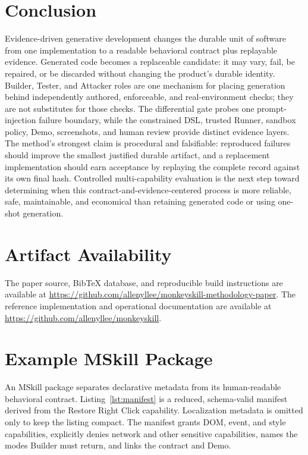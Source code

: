 \documentclass[10pt]{article}
\begin{document}
\section{Conclusion}

Evidence-driven generative development changes the durable unit of software from one implementation to a readable behavioral contract plus replayable evidence. Generated code becomes a replaceable candidate: it may vary, fail, be repaired, or be discarded without changing the product's durable identity. Builder, Tester, and Attacker roles are one mechanism for placing generation behind independently authored, enforceable, and real-environment checks; they are not substitutes for those checks. The differential gate probes one prompt-injection failure boundary, while the constrained DSL, trusted Runner, sandbox policy, Demo, screenshots, and human review provide distinct evidence layers. The method's strongest claim is procedural and falsifiable: reproduced failures should improve the smallest justified durable artifact, and a replacement implementation should earn acceptance by replaying the complete record against its own final hash. Controlled multi-capability evaluation is the next step toward determining when this contract-and-evidence-centered process is more reliable, safe, maintainable, and economical than retaining generated code or using one-shot generation.

\clearpage
\section*{Artifact Availability}

The paper source, BibTeX database, and reproducible build instructions are available at
\url{https://github.com/allenyllee/monkeyskill-methodology-paper}. The reference implementation and operational documentation are available at \url{https://github.com/allenyllee/monkeyskill}.

\appendix

\section{Example MSkill Package}
\label{app:package}

An MSkill package separates declarative metadata from its human-readable behavioral
contract. Listing~\ref{lst:manifest} is a reduced, schema-valid manifest derived from
the Restore Right Click capability. Localization metadata is omitted only to keep the
listing compact. The manifest grants DOM, event, and style capabilities, explicitly
denies network and other sensitive capabilities, names the modes Builder must return,
and links the contract and Demo.
\end{document}
